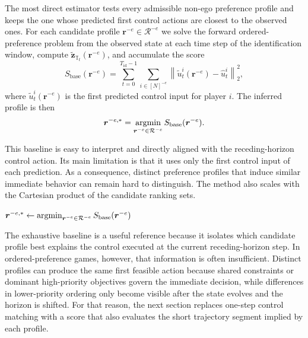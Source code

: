 The most direct estimator tests every admissible non-ego preference profile and keeps the one whose
predicted first control actions are closest to the observed ones.
For each candidate profile $\boldsymbol{r}^{-e} \in \mathcal R^{-e}$ we solve
the forward ordered-preference problem from the observed state at each time step of
the identification window, compute \(\tilde{\mathbf{z}}_{\mathbb{T}_t}(\boldsymbol{r}^{-e})\),
and accumulate the score
\begin{equation}
S_{\mathrm{base}}(\boldsymbol{r}^{-e})
=
\sum_{t=0}^{T_{\mathrm{id}}-1}
\sum_{i \in [N]^{-e}}
\left\lVert
\tilde{u}^i_t(\boldsymbol{r}^{-e}) - \hat{u}^i_t
\right\rVert_2^2,
\label{eq:inverse_baseline_score}
\end{equation}
where $\tilde{u}^i_t(\boldsymbol{r}^{-e})$ is the first predicted control input for player $i$.
The inferred profile is then
\[\boldsymbol{r}^{-e,*}
= \mathop{\textrm{argmin}}_{\boldsymbol{r}^{-e} \in \mathcal R^{-e}} S_{\mathrm{base}}(\boldsymbol{r}^{-e}).\]

This baseline is easy to interpret and directly aligned with the receding-horizon control action.
Its main limitation is that it uses only the first control input of each prediction.
As a consequence, distinct preference profiles that induce similar immediate behavior can remain hard to
distinguish.
The method also scales with the Cartesian product of the candidate ranking sets.

\begin{algorithm}
\medskip
{}
$\boldsymbol{r}^{-e,*} \gets
\mathop{\textrm{argmin}}_{\boldsymbol{r}^{-e} \in \mathcal R^{-e}} S_{\mathrm{base}}(\boldsymbol{r}^{-e})$\;
\caption{Exhaustive baseline for preference-order identification.}
\label{alg:inverse_baseline}
\end{algorithm}

The exhaustive baseline is a useful reference because it isolates 
which candidate profile best explains the control executed at the current receding-horizon step.
In ordered-preference games, however, that information is often insufficient. Distinct profiles can
produce the same first feasible action because shared constraints or dominant high-priority objectives
govern the immediate decision, while differences in lower-priority ordering only become visible after
the state evolves and the horizon is shifted. For that reason, the next section replaces one-step
control matching with a score that also evaluates the short trajectory segment implied by each profile.

